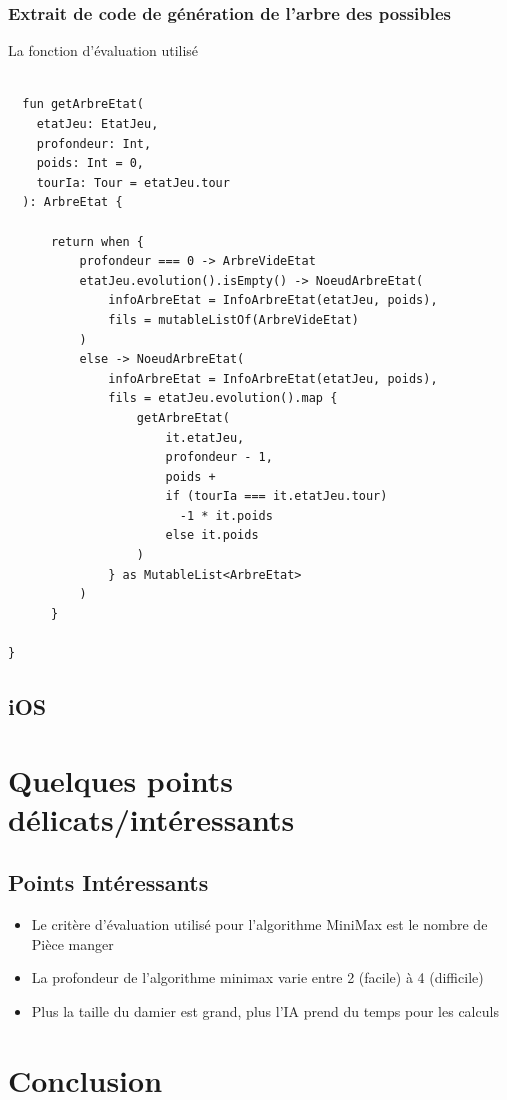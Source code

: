 \documentclass{article}
\begin{document}
\subsubsection{Extrait de code de génération de l'arbre des possibles}

La fonction d'évaluation utilisé 

\begin{verbatim}

  fun getArbreEtat(
    etatJeu: EtatJeu,
    profondeur: Int,
    poids: Int = 0,
    tourIa: Tour = etatJeu.tour
  ): ArbreEtat {

      return when {
          profondeur === 0 -> ArbreVideEtat
          etatJeu.evolution().isEmpty() -> NoeudArbreEtat(
              infoArbreEtat = InfoArbreEtat(etatJeu, poids), 
              fils = mutableListOf(ArbreVideEtat)
          )
          else -> NoeudArbreEtat(
              infoArbreEtat = InfoArbreEtat(etatJeu, poids),
              fils = etatJeu.evolution().map {
                  getArbreEtat(
                      it.etatJeu,
                      profondeur - 1,
                      poids + 
                      if (tourIa === it.etatJeu.tour) 
                        -1 * it.poids 
                      else it.poids
                  )
              } as MutableList<ArbreEtat>
          )
      }

}

\end{verbatim}


\subsection{iOS} %


\section{Quelques points délicats/intéressants}

\subsection{Points Intéressants}

\begin{itemize}
  \item Le critère d'évaluation utilisé pour l'algorithme MiniMax est le nombre de Pièce manger
  \item La profondeur de l'algorithme minimax varie entre 2 (facile) à 4 (difficile)
  \item Plus la taille du damier est grand, plus l'IA prend du temps pour les calculs
\end{itemize}

\section{Conclusion}




\end{document}
